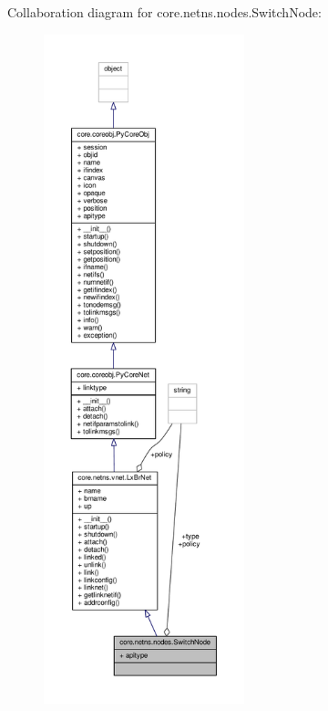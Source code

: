 Collaboration diagram for core.\+netns.\+nodes.\+Switch\+Node\+:
\nopagebreak
\begin{figure}[H]
\begin{center}
\leavevmode
\includegraphics[height=550pt]{classcore_1_1netns_1_1nodes_1_1_switch_node__coll__graph}
\end{center}
\end{figure}
